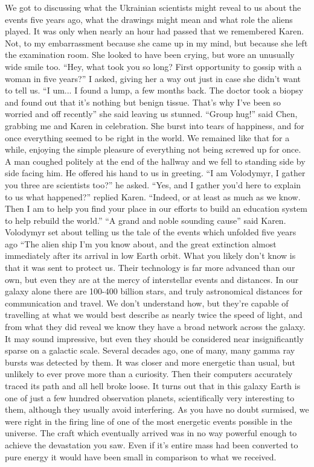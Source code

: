 \documentclass[a4paper]{article}
\begin{document}
We got to discussing what the Ukrainian scientists might reveal to us about the events five years ago, what the drawings might mean and what role the aliens played. It was only when nearly an hour had passed that we remembered Karen. Not, to my embarrassment because she came up in my mind, but because she left the examination room. She looked to have been crying, but wore an unusually wide smile too.
“Hey, what took you so long? First opportunity to gossip with a woman in five years?” I asked, giving her a way out just in case she didn’t want to tell us.
“I um... I found a lump, a few months back. The doctor took a biopsy and found out that it’s nothing but benign tissue. That’s why I’ve been so worried and off recently” she said leaving us stunned.
“Group hug!” said Chen, grabbing me and Karen in celebration. She burst into tears of happiness, and for once everything seemed to be right in the world. We remained like that for a while, enjoying the simple pleasure of everything not being screwed up for once.
A man coughed politely at the end of the hallway and we fell to standing side by side facing him. He offered his hand to us in greeting.
“I am Volodymyr, I gather you three are scientists too?” he asked.
“Yes, and I gather you’d here to explain to us what happened?” replied Karen.
“Indeed, or at least as much as we know. Then I am to help you find your place in our efforts to build an education system to help rebuild the world.”
“A grand and noble sounding cause” said Karen.
Volodymyr set about telling us the tale of the events which unfolded five years ago “The alien ship I’m you know about, and the great extinction almost immediately after its arrival in low Earth orbit. What you likely don’t know is that it was sent to protect us. Their technology is far more advanced than our own, but even they are at the mercy of interstellar events and distances. In our galaxy alone there are 100-400 billion stars, and truly astronomical distances for communication and travel. We don’t understand how, but they’re capable of travelling at what we would best describe as nearly twice the speed of light, and from what they did reveal we know they have a broad network across the galaxy. It may sound impressive, but even they should be considered near insignificantly sparse on a galactic scale. Several decades ago, one of many, many gamma ray bursts was detected by them. It was closer and more energetic than usual, but unlikely to ever prove more than a curiosity. Then their computers accurately traced its path and all hell broke loose.
It turns out that in this galaxy Earth is one of just a few hundred observation planets, scientifically very interesting to them, although they usually avoid interfering. As you have no doubt surmised, we were right in the firing line of one of the most energetic events possible in the universe. The craft which eventually arrived was in no way powerful enough to achieve the devastation you saw. Even if it’s entire mass had been converted to pure energy it would have been small in comparison to what we received.
\end{document}
